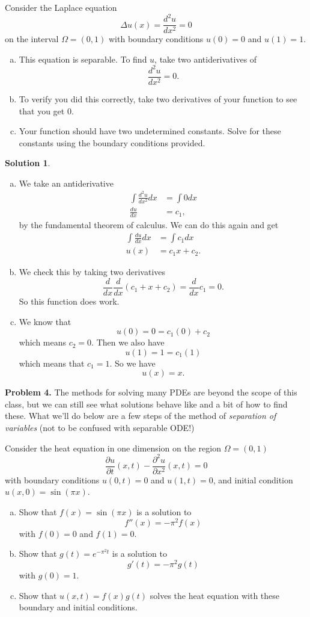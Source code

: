 \documentclass[12pt]{report} %
\theoremstyle{definition}
\newtheorem{solution}{Solution}
\begin{document}
Consider the Laplace equation
\[
\Delta u(x) = \frac{d^2u}{dx^2} = 0
\]
on the interval $\Omega = (0,1)$ with boundary conditions $u(0)=0$ and $u(1)=1$.  
\begin{enumerate}[(a)]
    \item This equation is separable. To find $u$, take two antiderivatives of
    \[
    \frac{d^2u}{dx^2}=0.
    \]
    \item To verify you did this correctly, take two derivatives of your function to see that you get $0$.
    \item Your function should have two undetermined constants.  Solve for these constants using the boundary conditions provided.
\end{enumerate}
\begin{solution}~
\begin{enumerate}[(a)]
    \item We take an antiderivative
    \begin{align*}
    \int \frac{d^2u}{dx^2} dx &= \int 0 dx\\
    \frac{du}{dx} &= c_1,
    \end{align*}
    by the fundamental theorem of calculus. We can do this again and get
    \begin{align*}
    \int \frac{du}{dx}dx &= \int c_1 dx\\
    u(x) &= c_1x+c_2.
    \end{align*}
    \item We check this by taking two derivatives
    \[
    \frac{d}{dx} \frac{d}{dx} (c_1+x+c_2) = \frac{d}{dx} c_1 = 0.
    \]
    So this function does work.
    \item We know that 
    \[
    u(0)= 0=c_1(0)+c_2 
    \]
    which means $c_2=0$. Then we also have
    \[
    u(1)= 1 = c_1(1)
    \]
    which means that $c_1=1$. So we have
    \[
    u(x)=x.
    \]
\end{enumerate}
\end{solution}
\vspace*{.5cm}

\noindent\textbf{Problem 4.} The methods for solving many PDEs are beyond the scope of this class, but we can still see what solutions behave like and a bit of how to find these. What we'll do below are a few steps of the method of \emph{separation of variables} (not to be confused with separable ODE!) 

Consider the heat equation in one dimension on the region $\Omega = (0,1)$
\[
\frac{\partial u}{\partial t}(x,t) - \frac{\partial^2 u}{\partial x^2}(x,t) = 0
\]
with boundary conditions $u(0,t)=0$ and $u(1,t)=0$, and initial condition $u(x,0)=\sin(\pi x)$.
\begin{enumerate}[(a)]
    \item Show that $f(x)=\sin(\pi x)$ is a solution to
    \[
    f''(x)=-\pi^2 f(x)
    \]
    with $f(0)=0$ and $f(1)=0$.
    \item Show that $g(t) = e^{-\pi^2 t}$ is a solution to 
    \[
    g'(t) = -\pi^2 g(t)
    \]
    with $g(0)=1$.
    \item Show that $u(x,t)=f(x)g(t)$ solves the heat equation with these boundary and initial conditions.
\end{enumerate}
\end{document}
